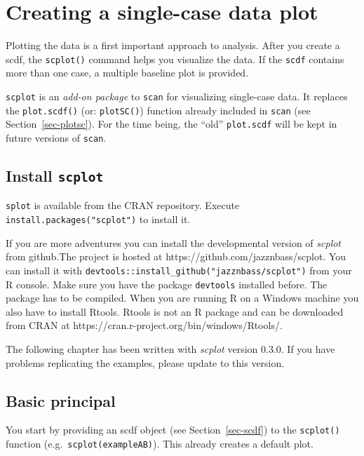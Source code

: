 \documentclass[
  letterpaper,
  DIV=11,
  numbers=noendperiod]{scrreprt}
\begin{document}
\hypertarget{sec-scplot}{%
\chapter{Creating a single-case data plot}\label{sec-scplot}}

Plotting the data is a first important approach to analysis. After you
create a scdf, the \texttt{scplot()} command helps you visualize the
data. If the \texttt{scdf} contains more than one case, a multiple
baseline plot is provided.

\texttt{scplot} is an \emph{add-on package} to \texttt{scan} for
visualizing single-case data. It replaces the \texttt{plot.scdf()} (or:
\texttt{plotSC()}) function already included in \texttt{scan} (see
Section~\ref{sec-plotsc}). For the time being, the ``old''
\texttt{plot.scdf} will be kept in future versions of \texttt{scan}.

\hypertarget{install-scplot}{%
\section{\texorpdfstring{Install
\texttt{scplot}}{Install scplot}}\label{install-scplot}}

\texttt{splot} is available from the CRAN repository. Execute
\texttt{install.packages("scplot")} to install it.

If you are more adventures you can install the developmental version of
\emph{scplot} from github.The project is hosted at
https://github.com/jazznbass/scplot. You can install it with
\texttt{devtools::install\_github("jazznbass/scplot")} from your R
console. Make sure you have the package \texttt{devtools} installed
before. The package has to be compiled. When you are running R on a
Windows machine you also have to install Rtools. Rtools is not an R
package and can be downloaded from CRAN at
https://cran.r-project.org/bin/windows/Rtools/.

The following chapter has been written with \emph{scplot} version 0.3.0.
If you have problems replicating the examples, please update to this
version.

\hypertarget{basic-principal}{%
\section{Basic principal}\label{basic-principal}}

You start by providing an scdf object (see Section~\ref{sec-scdf}) to
the \texttt{scplot()} function (e.g.~\texttt{scplot(exampleAB)}). This
already creates a default plot.
\end{document}
